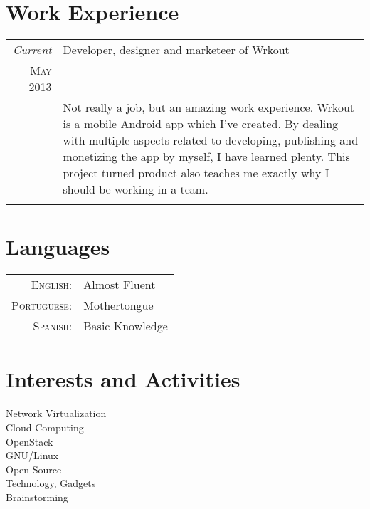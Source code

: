 \documentclass[a4paper,10pt]{article} %
\begin{document}

\section{Work Experience}

\begin{tabular}{r|p{11cm}}
	\emph{Current} & Developer, designer and marketeer of Wrkout \\
	\textsc{May 2013} & \\ 
	& \footnotesize{Not really a job, but an amazing work experience. Wrkout is a mobile Android app which I've created. By dealing with multiple aspects related to developing, publishing and monetizing the app by myself, I have learned plenty. This project turned product also teaches me exactly why I should be working in a team.}\\
	\multicolumn{2}{c}{} \\
	
\end{tabular}


\section{Languages}

\begin{tabular}{rl}
	\textsc{English:} & Almost Fluent\\
	
	\textsc{Portuguese:} & Mothertongue\\
	
	\textsc{Spanish:} & Basic Knowledge\\
\end{tabular}


\section{Interests and Activities}
Network Virtualization\\
Cloud Computing\\
OpenStack\\
GNU/Linux\\
Open-Source\\
Technology, Gadgets\\
Brainstorming\\
\end{document}
